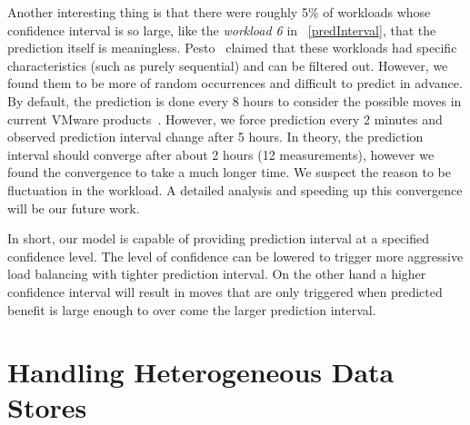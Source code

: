 Another interesting thing is that there were roughly 5\% of workloads whose confidence interval is so large, like the \emph{workload 6} in \figurename~\ref{predInterval}, that the prediction itself is meaningless.
Pesto~\cite{gulati:2011} claimed that these workloads had specific characteristics (such as purely sequential) and can be filtered out.
However, we found them to be more of random occurrences and difficult to predict in advance.
By default, the prediction is done every 8 hours to consider the possible moves in current VMware products~\cite{epping:2011}.
However, we force prediction every 2 minutes and observed prediction interval change after 5 hours.
In theory, the prediction interval should converge after about 2 hours (12 measurements), however we found the convergence to take a much longer time.
We suspect the reason to be fluctuation in the workload.
A detailed analysis and speeding up this convergence will be our future work.

In short, our model is capable of providing prediction interval at a specified confidence level.
The level of confidence can be lowered to trigger more aggressive load balancing with tighter prediction interval.
On the other hand a higher confidence interval will result in moves that are only triggered when predicted benefit is large enough to over come the larger prediction interval.

\section{Handling Heterogeneous Data Stores}

